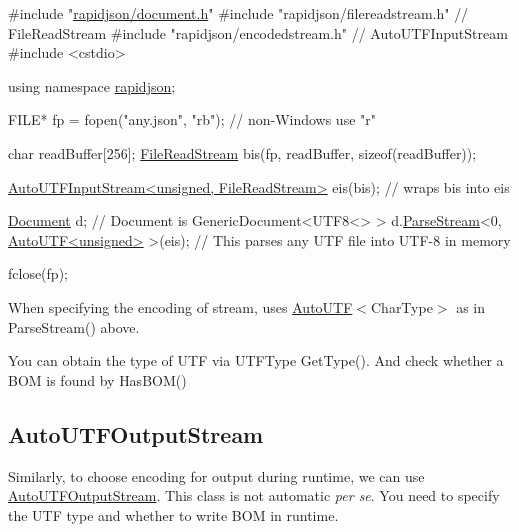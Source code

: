 \begin{DoxyCode}
\textcolor{preprocessor}{#include "\hyperlink{document_8h}{rapidjson/document.h}"}
\textcolor{preprocessor}{#include "rapidjson/filereadstream.h"}   \textcolor{comment}{// FileReadStream}
\textcolor{preprocessor}{#include "rapidjson/encodedstream.h"}    \textcolor{comment}{// AutoUTFInputStream}
\textcolor{preprocessor}{#include <cstdio>}

\textcolor{keyword}{using namespace }\hyperlink{namespacerapidjson}{rapidjson};

FILE* fp = fopen(\textcolor{stringliteral}{"any.json"}, \textcolor{stringliteral}{"rb"}); \textcolor{comment}{// non-Windows use "r"}

\textcolor{keywordtype}{char} readBuffer[256];
\hyperlink{class_file_read_stream}{FileReadStream} bis(fp, readBuffer, \textcolor{keyword}{sizeof}(readBuffer));

\hyperlink{class_auto_u_t_f_input_stream}{AutoUTFInputStream<unsigned, FileReadStream>} eis(bis);  \textcolor{comment}{//
       wraps bis into eis}

\hyperlink{class_generic_document}{Document} d;         \textcolor{comment}{// Document is GenericDocument<UTF8<> > }
d.\hyperlink{class_generic_document_afe94c0abc83a20f2d7dc1ba7677e6238}{ParseStream}<0, \hyperlink{struct_auto_u_t_f}{AutoUTF<unsigned>} >(eis); \textcolor{comment}{// This parses any UTF file into
       UTF-8 in memory}

fclose(fp);
\end{DoxyCode}


When specifying the encoding of stream, uses {\ttfamily \hyperlink{struct_auto_u_t_f}{Auto\+U\+TF}$<$Char\+Type$>$} as in {\ttfamily Parse\+Stream()} above.

You can obtain the type of U\+TF via {\ttfamily U\+T\+F\+Type Get\+Type()}. And check whether a B\+OM is found by {\ttfamily Has\+B\+O\+M()}\hypertarget{md_Commun_Externe_RapidJSON_doc_stream.zh-cn_AutoUTFOutputStream}{}\subsection{Auto\+U\+T\+F\+Output\+Stream}\label{md_Commun_Externe_RapidJSON_doc_stream.zh-cn_AutoUTFOutputStream}
Similarly, to choose encoding for output during runtime, we can use {\ttfamily \hyperlink{class_auto_u_t_f_output_stream}{Auto\+U\+T\+F\+Output\+Stream}}. This class is not automatic {\itshape per se}. You need to specify the U\+TF type and whether to write B\+OM in runtime.


